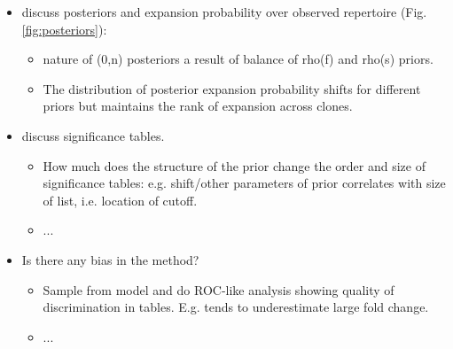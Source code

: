 \documentclass[letterpaper,english,prl,reprint,longbibliography]{revtex4-1} %
\begin{document}
\begin{itemize}

\item  discuss posteriors and expansion probability over observed repertoire (Fig. \ref{fig:posteriors}): 
\begin{itemize}
	\item nature of (0,n) posteriors a result of balance of rho(f) and rho(s) priors.
	\item The distribution of posterior expansion probability shifts for different priors but maintains the rank of expansion across clones. 
\end{itemize}

\item  discuss significance tables.
\begin{itemize}
	\item  How much does the structure of the prior change the order and size of significance tables: e.g. shift/other parameters of prior correlates with size of list, i.e. location of cutoff.
	\item  ...
\end{itemize}

\item Is there any bias in the method?
\begin{itemize}
	\item  Sample from model and do ROC-like analysis showing quality of discrimination in tables. E.g. tends to underestimate large fold change. 
	\item ... 
\end{itemize} 

\end{itemize}


% 
\end{document}
